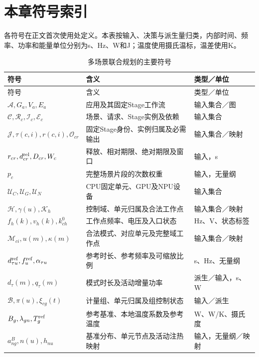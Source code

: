 \clearpage
\section*{本章符号索引}

各符号在正文首次使用处定义。本表按输入、决策与派生量归类，内部时间、频率、功率和能量单位分别为s、Hz、W和J；温度使用摄氏温标，温差使用K。

\begin{longtable}{@{}p{5.1cm}p{6.1cm}>{\raggedright\arraybackslash}p{2.8cm}@{}}
\caption{多场景联合规划的主要符号}\label{tab:symbols}\\
\toprule
符号 & 含义 & 类型／单位 \\
\midrule
\endfirsthead
\toprule
符号 & 含义 & 类型／单位 \\
\midrule
\endhead
\(\mathcal A,G_a,V_a,E_a\) & 应用及其固定Stage工作流 & 输入集合／图 \\
\(\mathcal C,\mathcal R_c,\mathcal I_c,\mathcal E_c\) & 场景、请求、Stage实例及依赖 & 输入集合 \\
\(\mathcal J,\tau(c,i),r(c,i),\mathcal O_{cr}\) & 固定Stage身份、实例归属及必需输出 & 输入集合／映射 \\
\(r_{cr},d^{\rm rel}_{cr},D_{cr},W_c\) & 释放、相对期限、绝对期限及窗口 & 输入，s \\
\(p_c\) & 完整场景片段的次数权重 & 输入，无量纲 \\
\(\mathcal U_C,\mathcal U_G,\mathcal U_N\) & CPU固定单元、GPU及NPU设备 & 输入集合 \\
\(\mathcal H,\gamma(u),\mathcal K_h\) & 控制域、单元归属及合法工作点 & 输入集合／映射 \\
\(f_h(k),v_h(k),k^0_{ch}\) & 工作点频率、电压及入口状态 & Hz、V、状态标签 \\
\(\mathcal M_{ci},u(m),\kappa(m)\) & 合法模式、对应单元及完整域工作点 & 输入集合／映射 \\
\(d^{\rm ref}_{\tau u},f^{\rm ref}_u,\alpha_{\tau u}\) & 参考时长、参考频率及可缩放比例 & s、Hz、无量纲 \\
\(d_\tau(m),q_\tau(m)\) & 模式时长及活动增量功率 & 派生／输入，s、W \\
\(\mathcal B,\pi(u),\xi_{cg}(t)\) & 计量组、单元归属及组控制状态 & 输入／派生 \\
\(B_g,\lambda_{gn},T_g^{\rm ref}\) & 参考基准、本地温度系数及参考温度 & W、W/K、摄氏度 \\
\(a^B_{ng},n(u),h_{nu}\) & 基准分布、单元节点及活动注热映射 & 输入，无量纲／映射 \\

\end{longtable}
